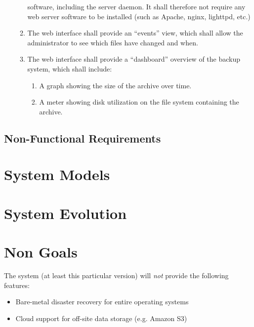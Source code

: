 \begin{enumerate}
\begin{enumerate}
                software, including the server daemon. It shall therefore not
                require any web server software to be installed (such as
                Apache, nginx, lighttpd, etc.)
            \item The web interface shall provide an ``events'' view, which
                shall allow the administrator to see which files have changed
                and when.
            \item The web interface shall provide a ``dashboard'' overview of
                the backup system, which shall include:
                \begin{enumerate}
                    \item A graph showing the size of the archive over time.
                    \item A meter showing disk utilization on the file system
                        containing the archive.
                \end{enumerate}
        \end{enumerate}
\end{enumerate}

\subsection{Non-Functional Requirements}

\section{System Models}

\section{System Evolution}

\section{Non Goals}

The system (at least this particular version) will \emph{not} provide the
following features:

\begin{itemize}
    \item Bare-metal disaster recovery for entire operating systems
    \item Cloud support for off-site data storage (e.g. Amazon S3)
\end{itemize}
